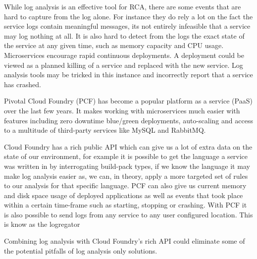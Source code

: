 While log analysis is an effective tool for RCA, there are some events that are hard to capture from the log alone. For instance they do rely a lot on the fact the service logs contain meaningful messages, its not entirely infeasible that a service may log nothing at all. It is also hard to detect from the logs the exact state of the service at any given time, such as memory capacity and CPU usage. Microservices encourage rapid continuous deployments\cite{villamizar2015evaluating}. A deployment could be viewed as a planned killing of a service and replaced with the new service. Log analysis tools may be tricked in this instance and incorrectly report that a service has crashed. 

Pivotal Cloud Foundry\cite{6924673} (PCF) has become a popular platform as a service (PaaS) over the last few years. It makes working with microservices much easier with features including zero downtime blue/green deployments, auto-scaling and access to a multitude of third-party services like MySQL and RabbitMQ.

Cloud Foundry has a rich public API which can give us a lot of extra data on the state of our environment, for example it is possible to get the language a service was written in by interrogating build-pack types, if we know the language it may make log analysis easier as, we can, in theory, apply a more targeted set of rules to our analysis for that specific language. PCF can also give us current memory and disk space usage of deployed applications as well as events that took place within a certain time-frame such as starting, stopping or crashing. With PCF it is also possible to send logs from any service to any user configured location. This is know as the logregator\cite{winn2017cloud}

Combining log analysis with Cloud Foundry's rich API could eliminate some of the potential pitfalls of log analysis only solutions. 